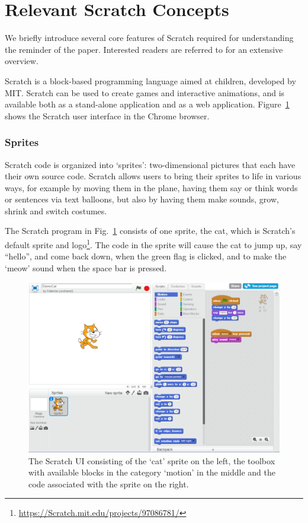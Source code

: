 \documentclass[conference]{IEEEtran}
\begin{document}
\section{Relevant Scratch Concepts}
\label{sec:Scratch}
We briefly introduce several core features of Scratch required for understanding the reminder of the paper. 
Interested readers are referred to \cite{brennan_creative_2014} for an extensive overview.  

Scratch is a block-based programming language aimed at children, developed by MIT. Scratch can be used to create games and interactive animations, and is available both as a stand-alone application and as a web application. Figure~\ref{fig:ui} shows the Scratch user interface in the Chrome browser.

\subsubsection{Sprites}
Scratch code is organized into `sprites': two-dimensional pictures that each have their own source code. Scratch allows users to bring their sprites to life in various ways, for example by moving them in the plane, having them say or think words or sentences via text balloons, but also by having them make sounds, grow, shrink and switch costumes. 

The Scratch program in Fig.~\ref{fig:ui} consists of one sprite, the cat, which is Scratch's default sprite and logo\footnote{\url{https://Scratch.mit.edu/projects/97086781/}}. The code in the sprite will cause the cat to jump up, say ``hello'', and come back down, when the green flag is clicked, and to make the `meow' sound when the space bar is pressed.

\begin{figure}
  \begin{center}
  \includegraphics[width=\columnwidth]{fig/ui.png}
  \caption{The Scratch UI consisting of the `cat' sprite on the left, the toolbox with available blocks in the category `motion' in the middle and the code associated with the sprite on the right.}
  \label{fig:ui}
  \end{center}
\end{figure} 
\end{document}
